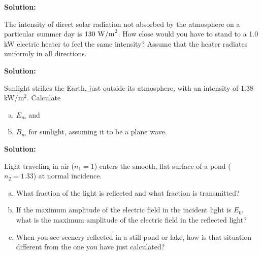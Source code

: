 \documentclass[11pt]{article}
\newcommand{\be}{\begin{enumerate}[a) ]}
\newcommand{\ee}{\end{enumerate}}
\begin{document}
\textbf{Solution:}\\

\clearpage

\begin{problem}
The intensity of direct solar radiation not absorbed by the atmosphere on a particular summer day is $130~\mathrm{W/m}^2$. 
How close would you have to stand to a 1.0 kW electric heater to feel the same
intensity? Assume that the heater radiates uniformly in all directions.
\end{problem}


\textbf{Solution:}\\

\clearpage

\begin{problem}
Sunlight strikes the Earth, just outside its atmosphere, with an intensity of 1.38 kW/$\text{m}^2$. Calculate
\be
\item $E_m$ and
\item $B_m$ for sunlight, assuming it to be a plane wave.
\ee
\end{problem}


\textbf{Solution:}\\

\clearpage

\begin{problem}
Light traveling in air ($n_1 = 1$) enters the smooth, flat surface of a pond ($n_2 = 1.33$) at normal
incidence.
\be
\item What fraction of the light is reflected and what fraction is transmitted?
\item  If the maximum amplitude of the electric field in the incident light is $E_0$, what is the maximum
amplitude of the electric field in the reflected light?
\item When you see scenery reflected in a still pond or lake, how is that situation different from
the one you have just calculated?
\ee
\end{problem}
\end{document}
